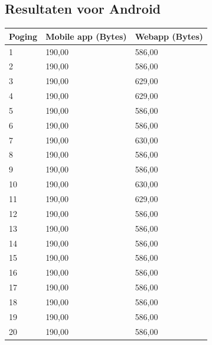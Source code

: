 \documentclass[pdftex,a4paper,12pt,twoside]{report}
\begin{document}
\subsection{Resultaten voor Android}
\begin{center}
  \begin{tabular}{ | l | l | l |}
      \hline
      Poging & Mobile app (Bytes) & Webapp (Bytes)
      \\ \hline
      1 & 190,00 & 586,00
      \\ \hline
      2 & 190,00 & 586,00
      \\ \hline
      3 & 190,00 & 629,00
      \\ \hline
      4 & 190,00 & 629,00
      \\ \hline
      5 & 190,00 & 586,00
      \\ \hline
      6 & 190,00 & 586,00
      \\ \hline
      7 & 190,00 & 630,00
      \\ \hline
      8 & 190,00 & 586,00
      \\ \hline
      9 & 190,00 & 586,00
      \\ \hline
      10 & 190,00 & 630,00
      \\ \hline
      11 & 190,00 & 629,00
      \\ \hline
      12 & 190,00 & 586,00
      \\ \hline
      13 & 190,00 & 586,00
      \\ \hline
      14 & 190,00 & 586,00
      \\ \hline
      15 & 190,00 & 586,00
      \\ \hline
      16 & 190,00 & 586,00
      \\ \hline
      17 & 190,00 & 586,00
      \\ \hline
      18 & 190,00 & 586,00
      \\ \hline
      19 & 190,00 & 586,00
      \\ \hline
      20 & 190,00 & 586,00
      \\ \hline
  \end{tabular}
\end{center}
\newpage
\end{document}
